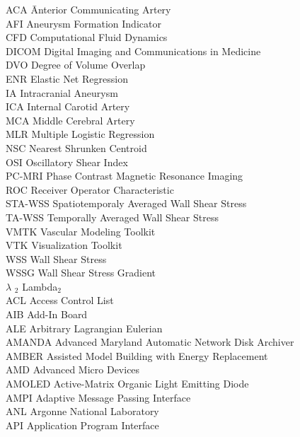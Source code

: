 %
\begin{tabbing}
ACA		\hspace{0.60in} \= Anterior Communicating Artery  \\
AFI		\> Aneurysm Formation Indicator \\
CFD		\> Computational Fluid Dynamics \\
DICOM	\> Digital Imaging and Communications in Medicine \\
DVO		\> Degree of Volume Overlap \\
ENR		\> Elastic Net Regression \\
IA  	\> Intracranial Aneurysm \\
ICA		\> Internal Carotid Artery \\
MCA		\> Middle Cerebral Artery \\
MLR		\> Multiple Logistic Regression \\
NSC		\> Nearest Shrunken Centroid \\
OSI		\> Oscillatory Shear Index \\
PC-MRI	\> Phase Contrast Magnetic Resonance Imaging \\
ROC		\> Receiver Operator Characteristic \\
STA-WSS	\> Spatiotemporaly Averaged Wall Shear Stress \\
TA-WSS	\> Temporally Averaged Wall Shear Stress \\
VMTK	\> Vascular Modeling Toolkit \\
VTK		\> Visualization Toolkit \\
WSS		\> Wall Shear Stress \\
WSSG	\> Wall Shear Stress Gradient \\
$\lambda$ $_2$	\> Lambda$_2$ \\
ACL     \> Access Control List\\
AIB     \> Add-In Board\\
ALE     \> Arbitrary Lagrangian Eulerian\\
AMANDA  \> Advanced Maryland Automatic Network Disk Archiver\\
AMBER   \> Assisted Model Building with Energy Replacement\\
AMD     \> Advanced Micro Devices\\
AMOLED  \> Active-Matrix Organic Light Emitting Diode\\
AMPI    \> Adaptive Message Passing Interface\\
ANL     \> Argonne National Laboratory\\
API     \> Application Program Interface\\

\end{tabbing}
